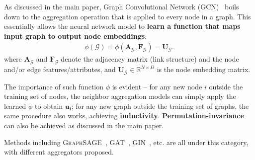 \documentclass{article}
\newcommand{\gcn}{\textsc{GCN}\xspace}
\newcommand{\gin}{\textsc{GIN}\xspace}
\begin{document}
\begin{itemize}
    As discussed in the main paper, Graph Convolutional Network (\gcn)~\cite{defferrard2016convolutional} boils down to the aggregation operation that is applied to every node in a graph. This essentially allows the neural network model to \textbf{{learn a function that maps input graph to output node embeddings}}:
    \begin{align}
    \label{eq:inductive_func}
    \phi (\mathcal{G}) = \phi (\bm{A}_{\mathcal{G}}, \bm{F}_{\mathcal{G}}) = \bm{U}_{\mathcal{G}}.
    \end{align}
    where $\bm{A}_{\mathcal{G}}$ and $\bm{F}_{\mathcal{G}}$ denote the adjacency matrix (link structure) and the node and/or edge features/attributes, and $\bm{U_{\mathcal{G}}} \in \mathbb{R}^{N \times D}$ is the node embedding matrix. 
    
    The importance of such function $\phi$ is evident -- for any new node $i$ outside the training set of nodes, the neighbor aggregation models can simply apply the learned $\phi$ to obtain $\bm{u_i}$; for any new graph outside the training set of graphs, the same procedure also works, achieving \textbf{{inductivity}}. \textbf{{Permutation-invariance}} can also be achieved as discussed in the main paper.
    
    Methods including \textsc{GraphSAGE}~\cite{hamilton2017inductive}, \textsc{GAT}~\cite{velickovic2017graph}, \gin~\cite{xu2018powerful}, etc. are all under this category, with different aggregators proposed.
\end{itemize}
\end{document}
